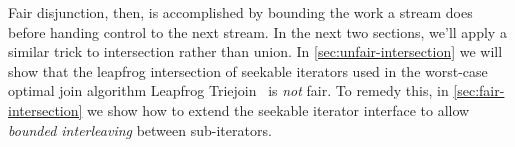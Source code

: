 \documentclass[acmsmall,screen,review,anonymous,dvipsnames,svgnames]{acmart}
\newcommand\hask[1]{\texttt{#1}}
\newcommand\todo[1]{{\color{Orange}#1}}
\renewcommand\todo[1]{{\color{IndianRed}#1}}
\renewcommand\todo[1]{\ignorespaces}
\begin{document}

\noindent
Fair disjunction, then, is accomplished by bounding the work a stream does before handing control to the next stream.
In the next two sections, we'll apply a similar trick to intersection rather than union.
In \cref{sec:unfair-intersection} we will show that the leapfrog intersection of seekable iterators used in the worst-case optimal join algorithm Leapfrog Triejoin~\citep{lftj} is \emph{not} fair.
To remedy this, in \cref{sec:fair-intersection} we show how to extend the seekable iterator interface to allow \emph{bounded interleaving} between sub-iterators. \todo{TODO: rephrase `bounded interleaving'?}






\end{document}
